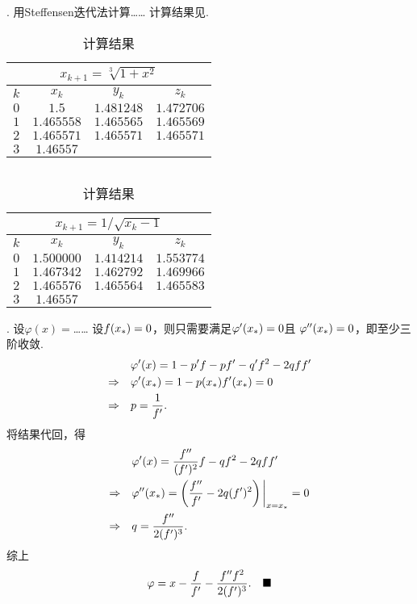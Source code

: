 \vspace{1cm}
\par{}. 用Steffensen迭代法计算……
\ans
  计算结果见.
  \begin{table}[htbp]
    \centering
    \caption{计算结果}
    \label{计算结果}
    \begin{tabular}{c|ccc}
      \toprule
      \multicolumn{4}{c}{$x_{k+1} = \sqrt[3]{1+x^2}$} \\
      \midrule
      $k$ & $x_k$ & $y_k$ & $z_k$ \\ \hline
      $0$ & $1.5$ & $1.481248$ & $1.472706$ \\
      $1$ & $1.465558$ & $1.465565$ & $1.465569$ \\
      $2$ & $1.465571$ & $1.465571$ &	$1.465571$ \\
      $3$ & $1.46557$ && \\ \bottomrule
    \end{tabular}
    $\qquad$
    \begin{tabular}{c|ccc}
      \toprule
      \multicolumn{4}{c}{$x_{k+1} = 1/\sqrt{x_k-1}$} \\
      \midrule
      $k$ & $x_k$ & $y_k$ & $z_k$ \\ \hline
      $0$ & $1.500000$ & $1.414214$ & $1.553774$ \\
      $1$ & $1.467342$ & $1.462792$	& $1.469966$ \\
      $2$ & $1.465576$ & $1.465564$ &	$1.465583$ \\
      $3$ & $1.46557$ & & \\ \bottomrule
    \end{tabular}
  \end{table}

\vspace{1cm}
\par{}. 设$\varphi(x) = $……
\ans
  设$\mathnormal{f}(x_*)=0$，则只需要满足$\varphi^{\prime}(x_*) = 0$且
  $\varphi^{\prime\prime}(x_*) = 0$，即至少三阶收敛.
  \[\begin{split}
     & \varphi^{\prime}(x) = 1-p^{\prime}\mathnormal{f} - p\mathnormal{f}^{\prime} - q^{\prime}\mathnormal{f}^2 - 2q\mathnormal{f}\mathnormal{f}^{\prime} \\
     \Rightarrow\quad &
     \varphi^{\prime}(x_*) = 1 - p(x_*)\mathnormal{f}^{\prime}(x_*) = 0 \\
     \Rightarrow\quad &
     p = \frac{1}{\mathnormal{f}^{\prime}}.
  \end{split}\]
  将结果代回，得
  \[\begin{split}
    & \varphi^{\prime}(x) = \frac{\mathnormal{f}^{\prime\prime}}{(\mathnormal{f}^{\prime})^2}\mathnormal{f} - q\mathnormal{f}^2-2q\mathnormal{f}\mathnormal{f}^{\prime} \\
    \Rightarrow\quad &
    \varphi^{\prime\prime}(x_*) = \left(\frac{\mathnormal{f}^{\prime\prime}}{\mathnormal{f}^{\prime}} - 2q(\mathnormal{f}^{\prime})^2\right)
    \bigg|_{x=x_*} = 0 \\
    \Rightarrow\quad &
    q = \frac{\mathnormal{f}^{\prime\prime}}{2(\mathnormal{f}^{\prime})^3}.
  \end{split}\]
  综上
  \[
    \varphi = x - \frac{\mathnormal{f}}{\mathnormal{f}^{\prime}} - \frac{\mathnormal{f}^{\prime\prime}\mathnormal{f}^2}{2(\mathnormal{f}^{\prime})^3}.
    \quad\blacksquare
  \]

